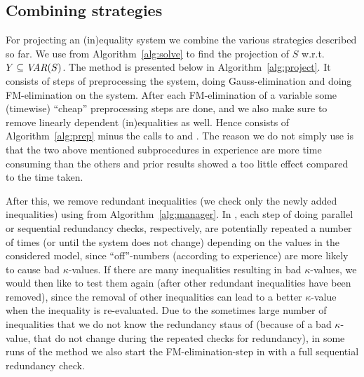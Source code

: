 \subsection{Combining strategies}
For projecting an (in)equality system we combine the various strategies described so far.
We use  from Algorithm~\ref{alg:solve} to find the projection of $S$ w.r.t. $Y\subseteq \mathit{VAR}(S)$. The method  is presented below in Algorithm~\ref{alg:project}. It consists of steps of preprocessing the system, doing Gauss-elimination and doing FM-elimination on the system. After each FM-elimination of a variable some (timewise) ``cheap'' preprocessing steps are done, and we also make sure to remove linearly dependent (in)equalities as well. 
Hence  consists of %
Algorithm~\ref{alg:prep} minus the calls to  and .
The reason we do not simply use  is that the two above mentioned subprocedures in experience 
are more time consuming than the others and prior results showed a too little effect compared to the time taken.

After this, we remove redundant inequalities (we check only the newly added inequalities) using  from Algorithm~\ref{alg:manager}. 
In , each step of doing parallel or sequential redundancy checks, respectively, are potentially repeated a number of times (or until the system does not change) depending on the values in the considered model, since ``off''-numbers (according to experience) are more likely to cause bad $\kappa$-values. If there are many inequalities resulting in bad $\kappa$-values, we would then like to test them again (after other redundant inequalities have been removed), since the removal of other inequalities can lead to a better $\kappa$-value when the inequality is re-evaluated.    
Due to the sometimes large number of inequalities that we do not know the redundancy staus of (because of a bad $\kappa$-value, that do not change during the repeated checks for redundancy), in some runs of the method we also start the FM-elimination-step in  with a full sequential redundancy check.

